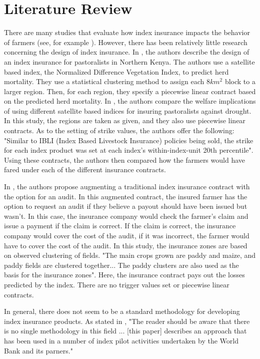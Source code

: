 \documentclass[11pt]{article}
\begin{document}
\section{Literature Review}
There are many studies that evaluate how index insurance impacts the behavior of farmers (see, for example \cite{karlan2014agricultural}). However, there has been relatively little research concerning the design of index insurance. In \cite{chantarat2013designing}, the authors describe the design of an index insurance for pastoralists in Northern Kenya. The authors use a satellite based index, the Normalized Difference Vegetation Index, to predict herd mortality. They use a statistical clustering method to assign each $8km^2$ block to a larger region. Then, for each region, they specify a piecewise linear contract based on the predicted herd mortality. In \cite{jensen2019does}, the authors compare the welfare implications of using different satellite based indices for insuring pastoralists against drought. In this study, the regions are taken as given, and they also use piecewise linear contracts. As to the setting of strike values, the authors offer the following: "Similar to IBLI (Index Based Livestock Insurance) policies being sold, the strike for each index product was set at each index's within-index-unit 20th percentile". Using these contracts, the authors then compared how the farmers would have fared under each of the different insurance contracts. 
    
In \cite{flatnes2018improving}, the authors propose augmenting a traditional index insurance contract with the option for an audit. In this augmented contract, the insured farmer has the option to request an audit if they believe a payout should have been issued but wasn't. In this case, the insurance company would check the farmer's claim and issue a payment if the claim is correct. If the claim is correct, the insurance company would cover the cost of the audit, if it was incorrect, the farmer would have to cover the cost of the audit. In this study, the insurance zones are based on observed clustering of fields. "The main crops grown are paddy and maize, and paddy fields are clustered together... The paddy clusters are also used as the basis for the insurance zones". Here, the insurance contract pays out the losses predicted by the index. There are no trigger values set or piecewise linear contracts. 

In general, there does not seem to be a standard methodology for developing index insurance products. As stated in \cite{world2011weather}, "The reader should be aware that there is no single methodology in this field ... [this paper] describes an approach that has been used in a number of index pilot activities undertaken by the World Bank and its parners." 
\end{document}
